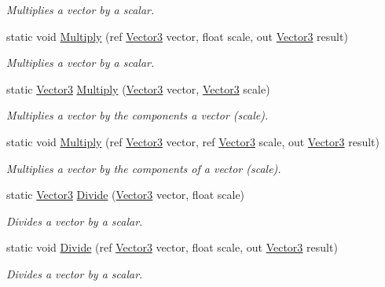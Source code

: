 \begin{DoxyCompactItemize}
\begin{DoxyCompactList}\small\item\em Multiplies a vector by a scalar. \end{DoxyCompactList}\item 
static void \hyperlink{struct_open_t_k_1_1_vector3_a76ae948f2a05f1bff3c69dc4911882a2}{Multiply} (ref \hyperlink{struct_open_t_k_1_1_vector3}{Vector3} vector, float scale, out \hyperlink{struct_open_t_k_1_1_vector3}{Vector3} result)
\begin{DoxyCompactList}\small\item\em Multiplies a vector by a scalar. \end{DoxyCompactList}\item 
static \hyperlink{struct_open_t_k_1_1_vector3}{Vector3} \hyperlink{struct_open_t_k_1_1_vector3_a1a52cade5c6b413e39a6806a680a7324}{Multiply} (\hyperlink{struct_open_t_k_1_1_vector3}{Vector3} vector, \hyperlink{struct_open_t_k_1_1_vector3}{Vector3} scale)
\begin{DoxyCompactList}\small\item\em Multiplies a vector by the components a vector (scale). \end{DoxyCompactList}\item 
static void \hyperlink{struct_open_t_k_1_1_vector3_ae7a8df01f76fa45abe3abcb23d7650aa}{Multiply} (ref \hyperlink{struct_open_t_k_1_1_vector3}{Vector3} vector, ref \hyperlink{struct_open_t_k_1_1_vector3}{Vector3} scale, out \hyperlink{struct_open_t_k_1_1_vector3}{Vector3} result)
\begin{DoxyCompactList}\small\item\em Multiplies a vector by the components of a vector (scale). \end{DoxyCompactList}\item 
static \hyperlink{struct_open_t_k_1_1_vector3}{Vector3} \hyperlink{struct_open_t_k_1_1_vector3_a54646cfefc327a5063cc9a215ae74792}{Divide} (\hyperlink{struct_open_t_k_1_1_vector3}{Vector3} vector, float scale)
\begin{DoxyCompactList}\small\item\em Divides a vector by a scalar. \end{DoxyCompactList}\item 
static void \hyperlink{struct_open_t_k_1_1_vector3_a3a78a5a9647d9cc7a8967618a441b2be}{Divide} (ref \hyperlink{struct_open_t_k_1_1_vector3}{Vector3} vector, float scale, out \hyperlink{struct_open_t_k_1_1_vector3}{Vector3} result)
\begin{DoxyCompactList}\small\item\em Divides a vector by a scalar. \end{DoxyCompactList}\item 

\end{DoxyCompactItemize}
